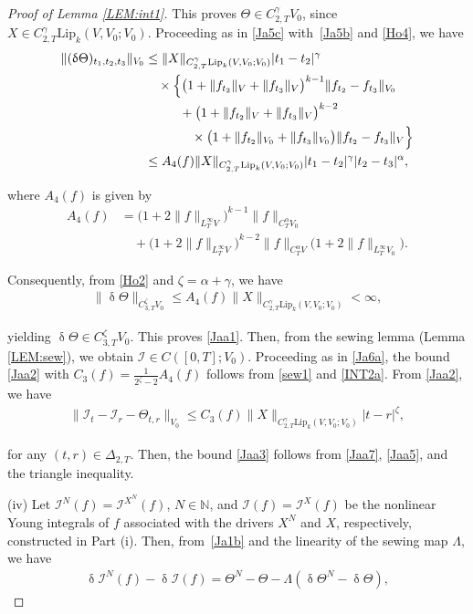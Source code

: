 \documentclass[letterpaper, 11pt,  reqno]{amsart}
\newcommand{\1}{\hspace{0.5mm}\text{I}\hspace{0.5mm}}
\newcommand{\I}{\mathcal{I}}
\newcommand{\noi}{\noindent}
\newcommand{\al}{\alpha}
\newcommand{\updl}{\updelta}
\newcommand{\Dl}{\Delta}
\newcommand{\g}{\gamma}
\newcommand{\Ld}{\Lambda}
\newcommand{\N}{\mathbb{N}}
\newcommand{\Lip}{\mathrm{Lip}}
\newcommand{\z}{\zeta}
\newcommand{\Ta}{\Theta}
\numberwithin{equation}{section}
\numberwithin{theorem}{section}
\begin{document}
\begin{proof}[Proof of Lemma \ref{LEM:int1}]
\noi
This proves 
$\Theta\in C^\g_{2,T} V_0$, 
since $X\in C^\g_{2,T}\Lip_k(V, V_0; V_0)$. 
Proceeding as in \eqref{Ja5c} with~\eqref{Ja5b} and \eqref{Ho4}, we have 
\begin{align*}
\| (\updl \Theta)_{t_1,t_2,t_3}\|_{ V_0}
& \leq \|X\|_{C^\g_{2,T}\Lip_k(V, V_0;V_0)} |t_1-t_2|^\g \notag \\
&\quad \times
\Big\{\big(1+\|f_{t_2}\|_{ V} + \|f_{t_3}\|_{ V}\big)^{k-1}
\|f_{t_2}-f_{t_3}\|_{ V_0} \notag \\
& \hphantom{XXX}+ \big(1+\|f_{t_2}\|_{ V} + \|f_{t_3}\|_{ V}\big)^{k-2} 
\\
& \hphantom{XXXX} \times \big(1+\|f_{t_2}\|_{ V_0} + \|f_{t_3}\|_{ V_0}\big)
\|f_{t_2}-f_{t_3}\|_{ V} \Big\}\notag \\
& \leq A_4(f) \|X\|_{C^\g_{2,T}\Lip_k(V, V_0; V_0)} |t_1-t_2|^\g 
|t_2 - t_3|^{\al} , \notag 
\end{align*}

\noi
where $A_4 (f)$ is given by 
\begin{align*}
A_4(f)
&= 
\big(1+ 2\|f\|_{L^\infty_T V} \big)^{k-1} \|f\|_{C^\al_T  V_0}\\
& \quad + \big(1+ 2\|f\|_{L^\infty_T V} \big)^{k-2} \|f\|_{C^\al_T  V}
\big(1+ 2\|f\|_{L^\infty_T V_0} \big).
\end{align*}



\noi
Consequently, 
from \eqref{Ho2}
and $\z = \al + \g$, 
we have 
\begin{align}
\label{INT2a}
\|\updl \Theta\|_{C^\z_{3,T} V_0}
\leq A_4(f)
\|X\|_{C^\g_{2,T}\Lip_k(V, V_0; V_0)}
<\infty,
\end{align}


\noi
yielding 
 $\updl \Theta \in C^\z_{3,T}  V_0$.
This proves \eqref{Jaa1}.
Then, from 
 the sewing lemma (Lemma \ref{LEM:sew}), 
 we obtain $\I\in C([0,T]; V_0)$. 
Proceeding as in \eqref{Ja6a}, 
the bound \eqref{Jaa2}
with $C_3(f)  = \frac{1}{2^\z -2} A_4(f)$
follows from \eqref{sew1} and \eqref{INT2a}.
From 
\eqref{Jaa2}, we have 
\begin{align}
\label{Jaa7}
\|\I_t - \I_r - \Theta_{t,r}\|_{ V_0}
\leq C_3(f)
\|X\|_{C^\g_{2,T}\Lip_k(V, V_0;V_0)}|t-r|^{\z},
\end{align}

\noi
for any  $(t,r)\in \Dl_{2,T}$.
Then,
the bound \eqref{Jaa3} follows  from \eqref{Jaa7}, \eqref{Jaa5}, 
and the triangle inequality.


\medskip

\noi
(iv)
Let $\I^N(f) = \I^{X^N}(f)$, $N \in \N$, and $\I(f) = \I^X(f)$
be the nonlinear Young integrals of $f$ 
associated with the drivers
$X^N$ and $X$, respectively, 
constructed in Part (i).
Then, 
from~\eqref{Ja1b} and the linearity of the sewing map $\Ld$, we have 
\begin{align}
\updl \I^N(f) - \updl \I(f)  = \Ta^N - \Ta - \Ld  (\updl \Ta^N - \updl \Ta), 
\label{YE1}
\end{align}



\end{proof}
\end{document}
